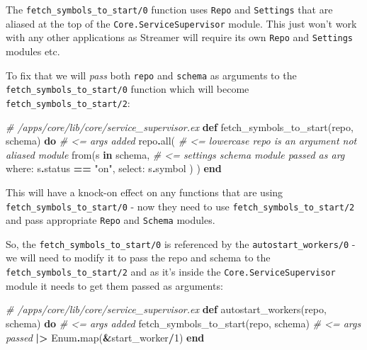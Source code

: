 \documentclass[
  oneside]{book}
\newenvironment{Shaded}{\begin{snugshade}}{\end{snugshade}}
\newcommand{\CommentTok}[1]{\textcolor[rgb]{0.56,0.35,0.01}{\textit{#1}}}
\newcommand{\ConstantTok}[1]{\textcolor[rgb]{0.00,0.00,0.00}{#1}}
\newcommand{\DecValTok}[1]{\textcolor[rgb]{0.00,0.00,0.81}{#1}}
\newcommand{\KeywordTok}[1]{\textcolor[rgb]{0.13,0.29,0.53}{\textbf{#1}}}
\newcommand{\NormalTok}[1]{#1}
\newcommand{\OperatorTok}[1]{\textcolor[rgb]{0.81,0.36,0.00}{\textbf{#1}}}
\newcommand{\StringTok}[1]{\textcolor[rgb]{0.31,0.60,0.02}{#1}}
\newcommand{\VariableTok}[1]{\textcolor[rgb]{0.00,0.00,0.00}{#1}}
\begin{document}
The \texttt{fetch\_symbols\_to\_start/0} function uses \texttt{Repo} and \texttt{Settings} that are aliased at the top of the \texttt{Core.ServiceSupervisor} module. This just won't work with any other applications as Streamer will require its own \texttt{Repo} and \texttt{Settings} modules etc.

To fix that we will \emph{pass} both \texttt{repo} and \texttt{schema} as arguments to the \texttt{fetch\_symbols\_to\_start/0} function which will become \texttt{fetch\_symbols\_to\_start/2}:

\begin{Shaded}
\begin{Highlighting}[]
  \CommentTok{\# /apps/core/lib/core/service\_supervisor.ex}
  \KeywordTok{def}\NormalTok{ fetch\_symbols\_to\_start(repo, schema) }\KeywordTok{do} \CommentTok{\# \textless{}= args added}
\NormalTok{    repo}\OperatorTok{.}\NormalTok{all( }\CommentTok{\# \textless{}= lowercase \textasciigrave{}repo\textasciigrave{} is an argument not aliased module}
\NormalTok{      from(s }\KeywordTok{in}\NormalTok{ schema, }\CommentTok{\# \textless{}= settings schema module passed as arg}
        \VariableTok{where:}\NormalTok{ s}\OperatorTok{.}\NormalTok{status }\OperatorTok{==} \StringTok{"on"}\NormalTok{,}
        \VariableTok{select:}\NormalTok{ s}\OperatorTok{.}\NormalTok{symbol}
\NormalTok{      )}
\NormalTok{    )}
  \KeywordTok{end}
\end{Highlighting}
\end{Shaded}

This will have a knock-on effect on any functions that are using \texttt{fetch\_symbols\_to\_start/0} - now they need to use \texttt{fetch\_symbols\_to\_start/2} and pass appropriate \texttt{Repo} and \texttt{Schema} modules.

So, the \texttt{fetch\_symbols\_to\_start/0} is referenced by the \texttt{autostart\_workers/0} - we will need to modify it to pass the repo and schema to the \texttt{fetch\_symbols\_to\_start/2} and as it's inside the \texttt{Core.ServiceSupervisor} module it needs to get them passed as arguments:

\begin{Shaded}
\begin{Highlighting}[]
  \CommentTok{\# /apps/core/lib/core/service\_supervisor.ex}
  \KeywordTok{def}\NormalTok{ autostart\_workers(repo, schema) }\KeywordTok{do} \CommentTok{\# \textless{}= args added}
\NormalTok{    fetch\_symbols\_to\_start(repo, schema) }\CommentTok{\# \textless{}= args passed}
    \OperatorTok{|\textgreater{}} \ConstantTok{Enum}\OperatorTok{.}\NormalTok{map(}\OperatorTok{\&}\NormalTok{start\_worker}\OperatorTok{/}\DecValTok{1}\NormalTok{)}
  \KeywordTok{end}
\end{Highlighting}
\end{Shaded}
\end{document}
